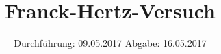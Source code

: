 


\subject{V601}
\title{Franck-Hertz-Versuch}
\date{
	Durchführung: 09.05.2017
	\hspace{4em}
	Abgabe: 16.05.2017
}


	\maketitle
	\newpage
	\tableofcontents
	\newpage
	
	
	
	
	
	
	\newpage
	
	\printbibliography

